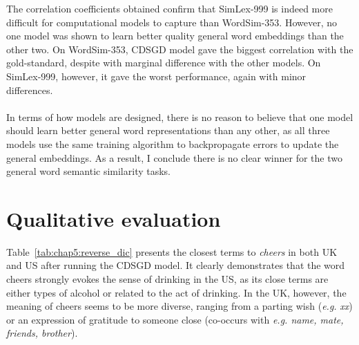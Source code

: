 \documentclass[a4paper,12pt,twoside,openright]{report}
\newcommand{\ti}{\textit}
\begin{document}
The correlation coefficients obtained confirm that SimLex-999 is indeed more difficult for computational models to capture than WordSim-353. However, no one model was shown to learn better quality general word embeddings than the other two. On WordSim-353, CDSGD model gave the biggest correlation with the gold-standard, despite with marginal difference with the other models. On SimLex-999, however, it gave the worst performance, again with minor differences. 
\\ \\
In terms of how models are designed, there is no reason to believe that one model should learn better general word representations than any other, as all three models use the same training algorithm to backpropagate errors to update the general embeddings. As a result, I conclude there is no clear winner for the two general word semantic similarity tasks.

\section{Qualitative evaluation}

Table~\ref{tab:chap5:reverse_dic} presents the closest terms to \ti{cheers} in both UK and US after running the CDSGD model. It clearly demonstrates that the word cheers strongly evokes the sense of drinking in the US, as its close terms are either types of alcohol or related to the act of drinking. In the UK, however, the meaning of cheers seems to be more diverse, ranging from a parting wish (\ti{e.g.} \ti{xx}) or an expression of gratitude to someone close (co-occurs with \ti{e.g. name, mate, friends, brother}).
\end{document}
